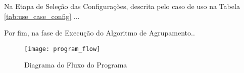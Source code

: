 Na Etapa de Seleção das Configurações, descrita pelo caso de uso na Tabela \ref{tab:use_case_config} ...

Por fim, na fase de Execução do Algoritmo de Agrupamento..


\begin{figure}
\centering
\texttt{[image: program\_flow]}
\caption[Diagram do Fluxo do Programa]{Diagrama do Fluxo do Programa} \label{fig:program_flow}
\end{figure}
